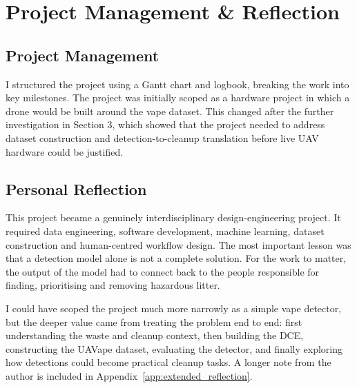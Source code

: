 \section{Project Management \& Reflection}
\subsection{Project Management}
I structured the project using a Gantt chart and logbook, breaking the work into key milestones. The project was initially scoped as a hardware project in which a drone would be built around the vape dataset. This changed after the further investigation in Section 3, which showed that the project needed to address dataset construction and detection-to-cleanup translation before live UAV hardware could be justified.

\subsection{Personal Reflection}
This project became a genuinely interdisciplinary design-engineering project. It required data engineering, software development, machine learning, dataset construction and human-centred workflow design. The most important lesson was that a detection model alone is not a complete solution. For the work to matter, the output of the model had to connect back to the people responsible for finding, prioritising and removing hazardous litter.

I could have scoped the project much more narrowly as a simple vape detector, but the deeper value came from treating the problem end to end: first understanding the waste and cleanup context, then building the DCE, constructing the UAVape dataset, evaluating the detector, and finally exploring how detections could become practical cleanup tasks. A longer note from the author is included in Appendix~\ref{app:extended_reflection}.
